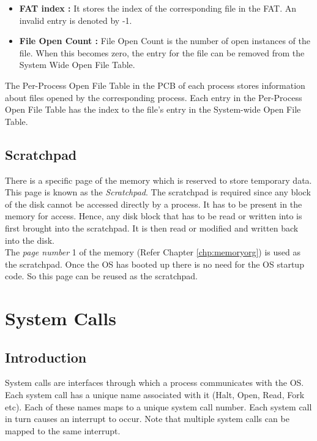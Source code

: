 \documentclass[10pt]{report}
\begin{document}
	 \begin{itemize}
		 \item \textbf{FAT index :}  It stores the index of the corresponding file in the FAT. An invalid entry is denoted by -1.

		 \item \textbf{File Open Count :} File Open Count is the number of open instances of the file. When this becomes zero, the entry for the file can be removed from the System Wide Open File Table.
	 \end{itemize}

The Per-Process Open File Table in the PCB of each process stores information about files opened by the corresponding process. Each entry in the Per-Process Open File Table has the index to the file's entry  in the  System-wide Open File Table.

\section{Scratchpad}
\label{sec:scratchpad}
There is a specific page of the memory which is reserved to store temporary data. This page is known as the \textit{Scratchpad}. The scratchpad is required since any block of the disk cannot be accessed directly  by a process. It has to be present in the memory for access. Hence, any disk block that has to be read or written into is first brought into the scratchpad. It is then read or modified and written back into the disk. \\

The \textit{page number} 1 of the memory (Refer Chapter \ref{chp:memoryorg}) is used as the scratchpad. Once the OS has booted up there is no need for the OS startup code. So this page can be reused as the scratchpad.


\chapter{System Calls}
\label{chp:system_calls}

\section{Introduction}
System calls are interfaces through which a process communicates with the OS. Each system call has a unique name associated with it (Halt, Open, Read, Fork etc). Each of these names maps to a unique system call number. Each system call in turn causes an interrupt to occur. Note that multiple system calls can be mapped to the same interrupt.
\end{document}
